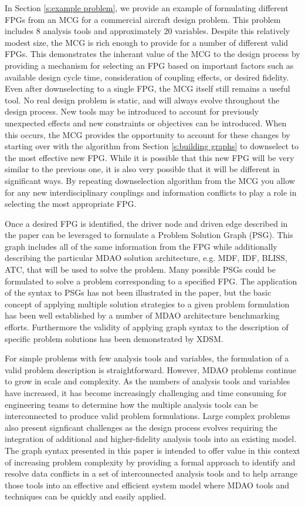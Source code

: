 In Section \ref{s:example problem}, we provide an example of 
formulating different FPGs from an MCG for a commercial aircraft design problem. This problem includes 8 
analysis tools and approximately 20 variables. Despite this relatively modest size, 
the MCG is rich enough to provide for a number of different valid FPGs. This demonstrates
the inherant value of the MCG to the design process by providing a mechanism for selecting 
an FPG based on important factors such as available design cycle time, consideration of 
coupling effects, or desired fidelity. Even after downselecting to a single FPG, the 
MCG itself still remains a useful tool. No real design problem is static, and will always
evolve throughout the design process. New tools may be introduced to account for previously 
unexpected effects and new constraints or objectives can be introduced. When this occurs, 
the MCG provides the opportunity to account for these changes by starting over with the 
algorithm from Section \ref{s:building graphs} to downselect to the most effective new FPG. 
While it is possible that this new FPG will be very similar to the previous one, 
it is also very possible that it will be different in significant ways. 
By repeating downselection algorithm from the MCG you allow for any new interdisciplinary couplings and  
information conflicts to play a role in selecting the most appropriate FPG. 

Once a desired FPG is identified, the driver node and driven edge described in the paper can be 
leveraged to formulate a Problem Solution Graph (PSG). This graph includes all of the 
same information from the FPG while additionally describing the particular MDAO 
solution architecture, e.g. MDF, IDF, BLISS, ATC, that will be used to solve the problem.  
Many possible PSGs could be formulated to solve a problem corresponding to a 
specified FPG. The application of the syntax to PSGs has not been illustrated in the paper, 
but the basic concept of applying multiple solution strategies to a given problem 
formulation has been well established by a number of MDAO architecture 
benchmarking efforts. Furthermore the validity of applying 
graph syntax to the description of specific problem solutions has been demonstrated 
by XDSM. 

For simple problems with few analysis tools and variables, the formulation of a 
valid problem description is straightforward.  However, MDAO problems continue to 
grow in scale and complexity. As the numbers of analysis tools and variables have 
increased, it has become increasingly challenging and time consuming for engineering 
teams to determine how the multiple analysis tools can be interconnected to produce 
valid problem formulations. Large complex problems also present signficant challenges
as the design process evolves requiring the integration of additional and higher-fidelity 
analysis tools into an existing model. The graph syntax presented in this paper 
is intended to offer value in this context of increasing problem complexity by 
providing a formal approach to identify and resolve data conflicts in a set of interconnected
analysis tools and to help arrange those tools into an effective and efficient system model
where MDAO tools and techniques can be quickly and easily applied.  


